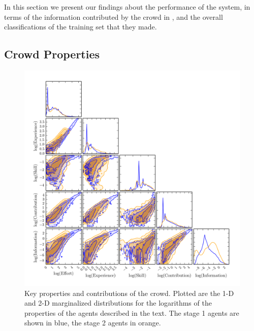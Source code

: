 \documentclass[useAMS,usenatbib,a4paper]{mn2e}
\begin{document}
In this section we present our findings about the performance of the  \sw
system, in terms of the information  contributed by the crowd in
, and the overall classifications of the training set
that they made. 


\subsection{Crowd Properties}
\label{sec:results:crowd}


% 

\begin{figure}
\centering\includegraphics[width=0.9\linewidth]{sw-system-figs/all_skill_contribution_experience_education.png}
\caption{Key properties and contributions of the \sw crowd. Plotted are the
1-D and 2-D marginalized distributions for the logarithms of the 
properties of the agents described in the text. The stage 1 agents are shown
in blue, the stage 2 agents in orange.}
\label{fig:crowd:cornerplot}
\end{figure}
\end{document}

